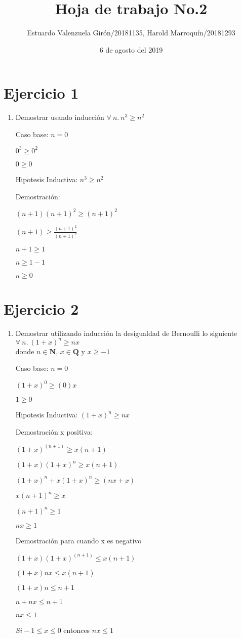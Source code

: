 \documentclass{article}
\author{Estuardo Valenzuela Girón/20181135, Harold Marroquín/20181293}
\title{Hoja de trabajo No.2}
\date{6 de agosto del 2019}
\begin{document}
\maketitle

\section{Ejercicio 1}
\begin{enumerate}
    \item Demostrar usando inducción  $\forall\ n.\ n^3\geq n^2$ \par
    Caso base: $n=0$ \par
    $ 0^3\geq 0^2$ \par
    $0\geq 0$ \par
    Hipotesis Inductiva: $ n^3\geq n^2\ $ \par
    Demostración: \par
    $(n+1)(n+1)^2 \geq (n+1)^2$ \par
    $(n+1)\geq \frac{(n+1)^2}{(n+1)^2}$ \par
    $n+1\geq 1$ \par
    $n\geq 1-1$ \par
    $n\geq 0$
\end{enumerate}

\section{Ejercicio 2}
\begin{enumerate}
    \item Demostrar utilizando inducci\'on la desigualdad de Bernoulli lo siguiente $\forall\ n.\ (1+x)^n\geq nx $\\donde $n\in \mathbf{N} $, $x\in \mathbf{Q}$ y $x\geq -1$ \par
    Caso base: $n=0$ \par
    $ (1+x)^0\geq (0)x$ \par
    $1\geq 0$\par
    Hipotesis Inductiva: $ (1+x)^n\geq nx\ $ \par
    Demostración x positiva: \par
    $(1+x)^{(n+1)} \geq x(n+1)$ \par
    $(1+x)(1+x)^n\geq x(n+1) $ \par
    $(1+x)^n+x(1+x)^n\geq (nx+x)$ \par
    $x(n+1)^n\geq x$ \par
    $(n+1)^n \geq 1$\par
    $nx \geq 1$\par
    Demostración para cuando x es negativo \par
    $(1+x)(1+x)^{(n+1)}\leq x(n+1)$\par 
    $(1+x)nx\leq x(n+1)$\par
    $(1+x)n\leq n+1$\par
    $n+nx\leq n+1$\par
    $nx\leq 1$ \par
    $Si -1 \leq x\leq 0$ entonces $nx\leq 1$
\end{enumerate}
\end{document}
